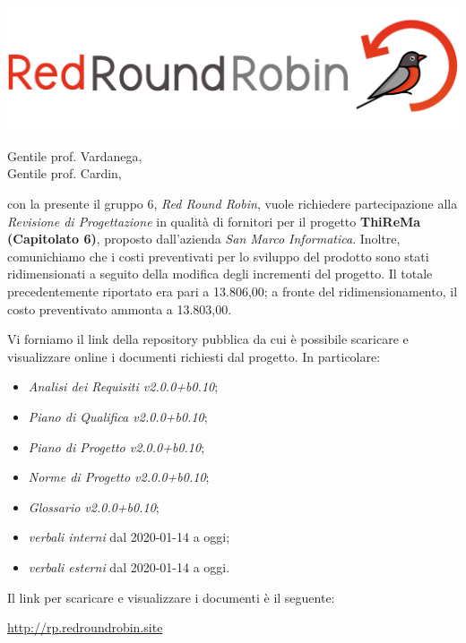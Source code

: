 \documentclass[12pt]{letter}
\date{09 marzo 2020}
\begin{document}
\begin{letter}{ }

\includegraphics[scale=0.17]{images/logo.png}

\opening{Gentile prof. Vardanega,\\ Gentile prof. Cardin, }

con la presente il gruppo 6, \textit{Red Round Robin}, vuole richiedere partecipazione alla \textit{Revisione di Progettazione} in qualità di fornitori per il progetto \textbf{ThiReMa (Capitolato 6)}, proposto dall'azienda \textit{San Marco Informatica}.
Inoltre, comunichiamo che i costi preventivati per lo sviluppo del prodotto sono stati ridimensionati a seguito della modifica degli incrementi del progetto. Il totale precedentemente riportato era pari a \EUR{}13.806,00; a fronte del ridimensionamento, il costo preventivato ammonta a \EUR{}13.803,00.

Vi forniamo il link della repository pubblica da cui è possibile scaricare e visualizzare online i documenti richiesti dal progetto.
In particolare:

\begin{itemize}
	\item \textit{Analisi dei Requisiti v2.0.0+b0.10};
	\item \textit{Piano di Qualifica v2.0.0+b0.10};
	\item \textit{Piano di Progetto v2.0.0+b0.10};
	\item \textit{Norme di Progetto v2.0.0+b0.10};
	\item \textit{Glossario v2.0.0+b0.10};
	\item \textit{verbali interni} dal 2020-01-14 a oggi;
	\item \textit{verbali esterni} dal 2020-01-14 a oggi.
\end{itemize}

\newpage

Il link per scaricare e visualizzare i documenti è il seguente:

\begin{center}
	\href{https://drive.google.com/}{http://rp.redroundrobin.site}
\end{center}



\end{letter}
\end{document}
